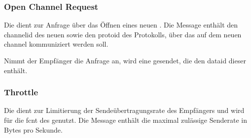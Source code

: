 \bmcpchblockstatrepbytefield


\subsubsection*{Open Channel Request}
\label{dcl-bmcp-openchreq}
Die \msg{\bmcpopenchreq} dient zur Anfrage über das Öffnen eines neuen
.
Die Message enthält den \gls{channelid} des neuen 
sowie den \gls{protoid} des Protokolls, über das auf dem neuen \gls{channel}
kommuniziert werden soll.

Nimmt der Empfänger die Anfrage an, wird eine \msg{\bmcpack} gesendet, die den
\gls{dataid} dieser \msg{\bmcpopenchreq} enthält.

\bmcpopenchreqbytefield


\subsubsection*{Throttle}
\label{dcl-bmcp-throttle}
Die \msg{\bmcpthrottle} dient zur Limitierung der Sendeübertragungsrate des
Empfängers und wird für die \gls{fcnt} des  genutzt.
Die Message enthält die maximal zulässige Senderate in Bytes pro Sekunde.

\bmcpthrottlebytefield
